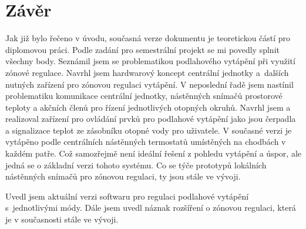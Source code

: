 \chapter{Závěr}
Jak již bylo řečeno v úvodu, současná verze dokumentu je teoretickou částí pro diplomovou práci. Podle zadání pro semestrální projekt se mi povedly splnit všechny body. Seznámil jsem se problematikou podlahového vytápění při využití zónové regulace. Navrhl jsem hardwarový koncept centrální jednotky a~dalších nutných zařízení pro zónovou regulaci vytápění. V  neposlední řadě jsem nastínil problematiku komunikace centrální jednotky, nástěnných snímačů prostorové teploty a akčních členů pro řízení jednotlivých otopných okruhů. Navrhl jsem a realizoval zařízení pro ovládání prvků pro podlahové vytápění jako jsou čerpadla a signalizace teplot ze zásobníku otopné vody pro uživatele. V současné verzi je vytápěno podle centrálních nástěnných termostatů umístěných na chodbách v každém patře. Což samozřejmě není ideální řešení z pohledu vytápění a úspor, ale jedná se o základní verzi tohoto systému. Co se týče prototypů lokálních nástěnných snímačů pro zónovou regulaci, ty jsou stále ve vývoji.

Uvedl jsem aktuální verzi softwaru pro regulaci podlahové vytápění s~jednotlivými módy. Dále jsem uvedl náznak rozšíření o zónovou regulaci, která je v současnosti stále ve vývoji.
